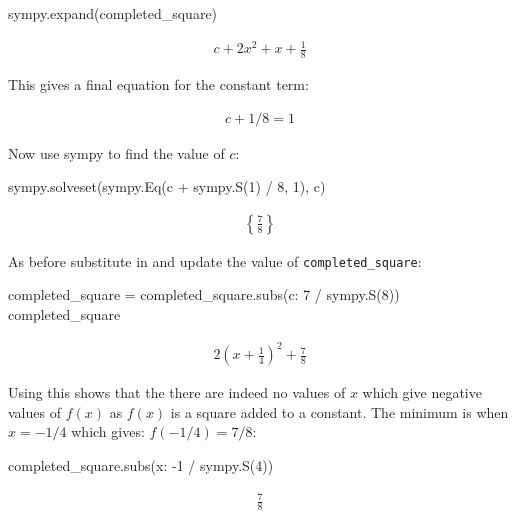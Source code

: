 \begin{pyin}
sympy.expand(completed_square)
\end{pyin}

\begin{equation*}
\begin{split}\displaystyle c + 2 x^{2} + x + \frac{1}{8}\end{split}
\end{equation*}

This gives a final equation for the constant term:

\begin{equation*}
\begin{split}
    c + 1 / 8 = 1
\end{split}
\end{equation*}

Now use sympy to find the value of \(c\):

\begin{pyin}
sympy.solveset(sympy.Eq(c + sympy.S(1) / 8, 1), c)
\end{pyin}

\begin{equation*}
\begin{split}\displaystyle \left\{\frac{7}{8}\right\}\end{split}
\end{equation*}

As before substitute in and update the value of \texttt{completed\_square}:

\begin{pyin}
completed_square = completed_square.subs({c: 7 / sympy.S(8)})
completed_square
\end{pyin}

\begin{equation*}
\begin{split}\displaystyle 2 \left(x + \frac{1}{4}\right)^{2} + \frac{7}{8}\end{split}
\end{equation*}

Using this shows that the there are indeed no values of \(x\) which give
negative values of \(f(x)\) as \(f(x)\) is a square added to a constant.
The minimum is when \(x=-1/4\) which gives: \(f(-1/4)=7/8\):

\begin{pyin}
completed_square.subs({x: -1 / sympy.S(4)})
\end{pyin}

\begin{equation*}
\begin{split}\displaystyle \frac{7}{8}\end{split}
\end{equation*}

